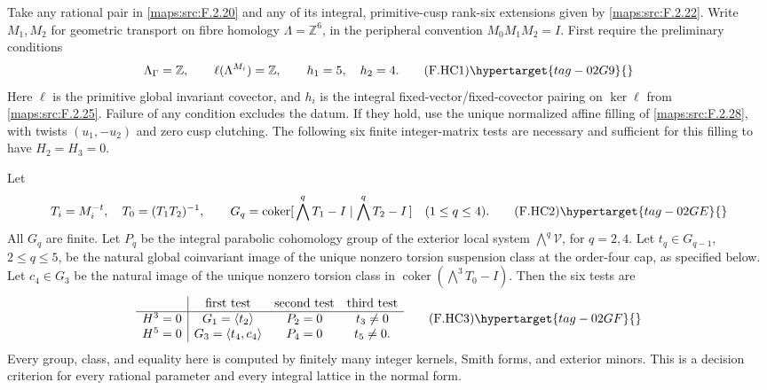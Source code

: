 \begin{theorem}\hypertarget{tag-02NJ}{}\label{maps:src:F.2.29}


Take any rational pair in \ref{maps:src:F.2.20} and any of its integral,
primitive-cusp rank-six extensions given by \ref{maps:src:F.2.22}.
Write $M_1,M_2$ for geometric transport on fibre homology
$\Lambda=\mathbb Z^6$, in the peripheral convention
$M_0M_1M_2=I$.
First require the preliminary conditions
\[
 \Lambda_\Gamma=\mathbb Z,\qquad
 \ell(\Lambda^{M_i})=\mathbb Z,\qquad h_1=5,\quad h_2=4 .
 \tag{F.HC1}\hypertarget{tag-02G9}{}\label{maps:eq:F.HC1}
\]
Here $\ell$ is the primitive global invariant covector, and
$h_i$ is the integral fixed-vector/fixed-covector pairing
on $\ker\ell$ from \ref{maps:src:F.2.25}.
Failure of any condition excludes the datum.
If they hold, use the unique normalized affine filling of
\ref{maps:src:F.2.28}, with twists $(u_1,-u_2)$ and zero cusp clutching.
The following six finite integer-matrix tests are necessary
and sufficient for this filling to have $H_2=H_3=0$.

Let
\[
 T_i=M_i^{-t},\quad T_0=(T_1T_2)^{-1},\qquad
 G_q=\operatorname{coker}
 [\,\bigwedge^qT_1-I\mid\bigwedge^qT_2-I\,]
 \quad(1\le q\le4).
 \tag{F.HC2}\hypertarget{tag-02GE}{}\label{maps:eq:F.HC2}
\]
All $G_q$ are finite.  Let $P_q$ be the integral parabolic
cohomology group of the exterior local system
$\bigwedge^q\mathcal V$, for $q=2,4$.
Let $t_q\in G_{q-1}$, $2\le q\le5$, be the natural global
coinvariant image of the unique nonzero torsion suspension
class at the order-four cap, as specified below.
Let $c_4\in G_3$ be the natural image of the unique nonzero
torsion class in
$\operatorname{coker}(\bigwedge^3T_0-I)$.
Then the six tests are
\[
\begin{array}{c|ccc}
 &\text{first test}&\text{second test}&\text{third test}\\ \hline
 H^3=0&G_1=\langle t_2\rangle&P_2=0&t_3\ne0\\
 H^5=0&G_3=\langle t_4,c_4\rangle&P_4=0&t_5\ne0 .
\end{array}
\tag{F.HC3}\hypertarget{tag-02GF}{}\label{maps:eq:F.HC3}
\]
Every group, class, and equality here is computed by
finitely many integer kernels, Smith forms, and exterior
minors.  This is a decision criterion for every rational parameter and every integral lattice in the normal form.

\end{theorem}


